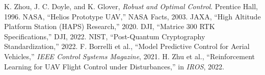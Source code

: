 \documentclass[conference]{IEEEtran}
\begin{document}
\balance

\begin{thebibliography}{99}
 K. Zhou, J. C. Doyle, and K. Glover, \emph{Robust and Optimal Control}. Prentice Hall, 1996.
 NASA, ``Helios Prototype UAV,'' NASA Facts, 2003.
 JAXA, ``High Altitude Platform Station (HAPS) Research,'' 2020.
 DJI, ``Matrice 300 RTK Specifications,'' DJI, 2022.
 NIST, ``Post-Quantum Cryptography Standardization,'' 2022.
 F. Borrelli et al., ``Model Predictive Control for Aerial Vehicles,'' \emph{IEEE Control Systems Magazine}, 2021.
 H. Zhu et al., ``Reinforcement Learning for UAV Flight Control under Disturbances,'' in \emph{IROS}, 2022.
\end{thebibliography}
\end{document}
